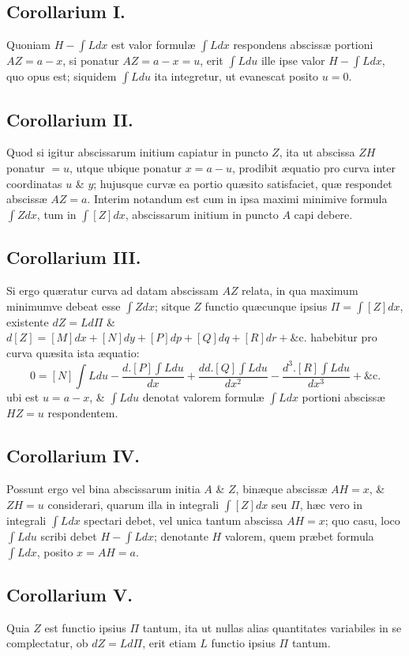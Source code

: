 \subsection*{Corollarium I.}
Quoniam $H-\int Ldx$ est valor formulæ $\int Ldx$ respondens abscissæ portioni $AZ=a-x$, si ponatur $AZ=a-x=u$, erit $\int Ldu$ ille ipse valor $H-\int Ldx$, quo opus est; siquidem $\int Ldu$ ita integretur, ut evanescat posito $u=0$.
\subsection*{Corollarium II.}
Quod si igitur abscissarum initium capiatur in puncto $Z$, ita ut abscissa $ZH$ ponatur $=u$, utque ubique ponatur $x=a-u$, prodibit æquatio pro curva inter coordinatas $u$ \& $y$; hujusque curvæ ea portio quæsito satisfaciet, quæ respondet abscissæ $AZ=a$. Interim notandum est cum in ipsa maximi minimive formula $\int Zdx$, tum in $\int[Z]dx$, abscissarum initium in puncto $A$ capi debere.
\subsection*{Corollarium III.}
Si ergo quæratur curva ad datam abscissam $AZ$ relata, in qua maximum minimumve debeat esse $\int Zdx$; sitque $Z$ functio quæcunque ipsius $\Pi=\int[Z]dx$, existente $dZ=Ld\Pi$ \& $d[Z]=[M]dx+[N]dy+[P]dp+[Q]dq+[R]dr+\text{\&c.}$ habebitur pro curva quæsita ista æquatio:
\[0=[N]\int Ldu-\frac{d.[P]\int Ldu}{dx}+\frac{dd.[Q]\int Ldu}{dx^2}-\frac{d^3.[R]\int Ldu}{dx^3}+\text{\&c.}\]
ubi est $u=a-x$, \& $\int Ldu$ denotat valorem formulæ $\int Ldx$ portioni abscissæ $HZ=u$ respondentem.
\subsection*{Corollarium IV.}
Possunt ergo vel bina abscissarum initia $A$ \& $Z$, binæque abscissæ $AH=x$, \& $ZH=u$ considerari, quarum illa in integrali $\int[Z]dx$ seu $\Pi$, hæc vero in integrali $\int Ldx$ spectari debet, vel unica tantum abscissa $AH=x$; quo casu, loco
$\int Ldu$ scribi debet $H-\int Ldx$; denotante $H$ valorem, quem præbet formula $\int Ldx$, posito $x=AH=a$.
\subsection*{Corollarium V.}
Quia $Z$ est functio ipsius $\Pi$ tantum, ita ut nullas alias quantitates variabiles in se complectatur, ob $dZ=Ld\Pi$, erit etiam $L$ functio ipsius $\Pi$ tantum.
